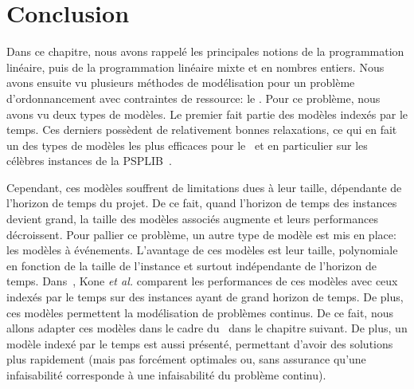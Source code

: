 \section*{Conclusion}

Dans ce chapitre, nous avons rappelé les principales notions de la
programmation linéaire, puis de la programmation linéaire mixte et en
nombres entiers. Nous avons ensuite vu plusieurs méthodes de
modélisation pour un problème d'ordonnancement avec contraintes de
ressource: le \RCPSP. Pour ce problème, nous avons vu deux types de
modèles. Le premier fait partie des modèles indexés par le temps. Ces
derniers possèdent de relativement bonnes relaxations, ce qui en fait
un des types de modèles les plus efficaces pour le \RCPSP~et en
particulier sur les célèbres instances de la PSPLIB~\cite{PSPLIB}. 

Cependant, ces modèles souffrent de limitations dues à leur taille,
dépendante de l'horizon de temps du projet. De ce fait, quand
l'horizon de temps des instances devient grand, la taille des modèles
associés augmente et leurs performances décroissent. Pour pallier ce
problème, un autre type de modèle est mis en place: les modèles à
événements. L'avantage de ces modèles est leur taille, polynomiale en
fonction de la taille de l'instance et surtout indépendante de
l'horizon de temps. Dans~\cite{modele_RCPSP}, Kone {\it et al.}
comparent les performances de ces modèles avec ceux indexés par le
temps sur des instances ayant de grand horizon de temps. De plus, ces
modèles permettent la modélisation de problèmes continus. De ce fait,
nous allons adapter ces modèles dans le cadre du \CECSP~dans le
chapitre suivant. De plus, un modèle indexé par le temps est aussi
présenté, permettant d'avoir des solutions plus rapidement (mais pas
forcément optimales ou, sans assurance qu'une infaisabilité
corresponde à une infaisabilité du problème continu). 